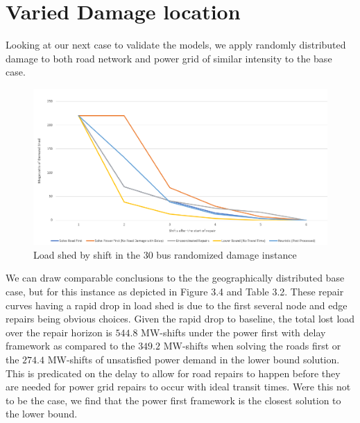 \section{Varied Damage location}
Looking at our next case to validate the models, we apply randomly distributed damage to both road network and power grid of similar intensity to the base case.
\begin{figure}[htbp]
	\centering
	
	\centering
	\includegraphics[width=.9\linewidth]{Rplot30Rand.png}
	\caption{Load shed by shift in the 30 bus randomized damage instance}
	\label{fig:sub1}
\end{figure}
\begin{table}[htbp]
	\centering
	\caption{Total load shed over the repair horizon for the random damage instance}
	
	\label{time}
\end{table}
We can draw comparable conclusions to the the geographically distributed base case, but for this instance as depicted in Figure 3.4 and Table 3.2. These repair curves having a rapid drop in load shed is due to the first several node and edge repairs being obvious choices. Given the rapid drop to baseline, the total lost load over the repair horizon is $544.8$ MW-shifts under the power first with delay framework as compared to the $349.2$ MW-shifts when solving the roads first or the $274.4$ MW-shifts of unsatisfied power demand in the lower bound solution. This is predicated on the delay to allow for road repairs to happen before they are needed for power grid repairs to occur with ideal transit times. Were this not to be the case, we find that the power first framework is the closest solution to the lower bound.

